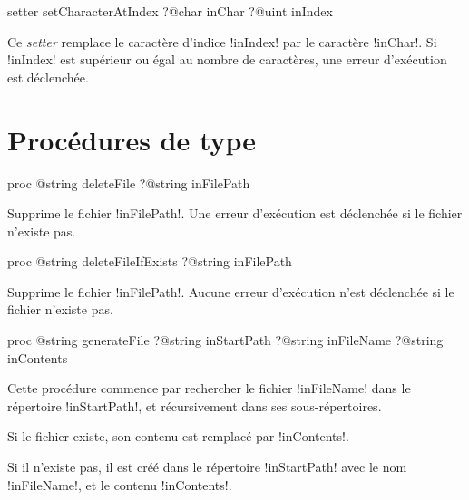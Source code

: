 
\begin{galgasbox}
setter setCharacterAtIndex
   ?@char inChar
   ?@uint inIndex
\end{galgasbox}


Ce \emph{setter} remplace le caractère d'indice \ggs!inIndex! par le caractère \ggs!inChar!. Si \ggs!inIndex! est supérieur ou égal au nombre de caractères, une erreur d'exécution est déclenchée. 




\section{Procédures de type}




\begin{galgasbox}
proc @string deleteFile ?@string inFilePath
\end{galgasbox}

Supprime le fichier \ggs!inFilePath!. Une erreur d'exécution est déclenchée si le fichier n'existe pas.






\begin{galgasbox}
proc @string deleteFileIfExists ?@string inFilePath
\end{galgasbox}

Supprime le fichier \ggs!inFilePath!. Aucune erreur d'exécution n'est déclenchée si le fichier n'existe pas.








\begin{galgasbox}
proc @string generateFile
   ?@string inStartPath
   ?@string inFileName
   ?@string inContents
\end{galgasbox}

Cette procédure commence par rechercher le fichier \ggs!inFileName! dans le répertoire \ggs!inStartPath!, et récursivement dans ses sous-répertoires.

Si le fichier existe, son contenu est remplacé par \ggs!inContents!.

Si il n'existe pas, il est créé dans le répertoire \ggs!inStartPath! avec le nom \ggs!inFileName!, et le contenu \ggs!inContents!.








